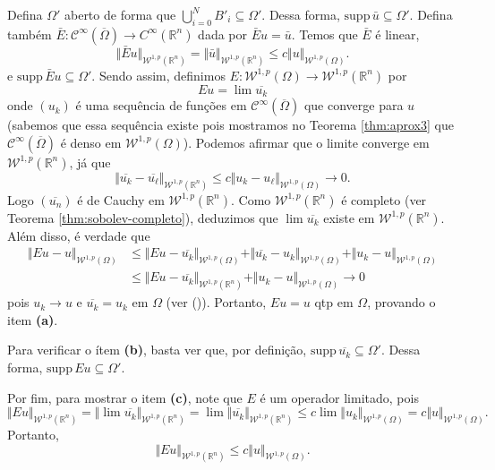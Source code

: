 \documentclass[a4paper, 11pt]{book}
\theoremstyle{definition}
\newcommand{\bR}{\mathbb{R}}
\newcommand{\cC}{\mathcal{C}}
\newcommand{\cW}{\mathcal{W}}
\newcommand{\supp}{\mathrm{supp}\,}
\begin{document}
\begin{prf}
    Defina $\Omega'$ aberto de forma que $\bigcup_{i=0}^N B'_i \subseteq \Omega'$.
    Dessa forma, $\supp \bar u \subseteq \Omega'$.
    Defina também $\bar E: \cC^\infty(\overline\Omega) \to C^\infty(\bR^n)$ dada por $\bar E u = \bar u$.
    Temos que $\bar E$ é linear,
    \[
        \Vert \bar E u \Vert_{\cW^{1,p}(\bR^n)} = \Vert \bar u \Vert_{\cW^{1,p}(\bR^n)} \leqslant c \Vert u \Vert_{\cW^{1,p}(\Omega)}.
    \]
    e $\supp \bar E u \subseteq \Omega'.$
    Sendo assim, definimos $E : \cW^{1,p}(\Omega) \to \cW^{1,p}(\bR^n)$ por
    \[
        Eu = \lim \overline{u_k}
    \]
    onde $(u_k)$ é uma sequência de funções em $\cC^\infty(\overline\Omega)$ que converge para $u$ (sabemos que essa sequência existe pois mostramos no Teorema \ref{thm:aprox3} que $\cC^\infty(\overline\Omega)$ é denso em $\cW^{1,p}(\Omega)$).
    Podemos afirmar que o limite converge em $\cW^{1,p}(\bR^n)$, já que
    \[
        \Vert \overline{u_k} - \overline{u_\ell} \Vert_{\cW^{1,p}(\bR^n)} \leqslant c \Vert u_k - u_\ell \Vert_{\cW^{1,p}(\Omega)} \to 0.
    \]
    Logo $(\overline{u_n})$ é de Cauchy em $\cW^{1,p}(\bR^n)$.
    Como $\cW^{1,p}(\bR^n)$ é completo (ver Teorema \ref{thm:sobolev-completo}), deduzimos que $\lim \overline{u_k}$ existe em $\cW^{1,p}(\bR^n)$.
    Além disso, é verdade que
    \[
        \begin{aligned}
            \Vert Eu - u \Vert_{\cW^{1,p}(\Omega)} &\leqslant \Vert Eu - \overline{u_k} \Vert_{\cW^{1,p}(\Omega)} + \Vert \overline{u_k} - u_k \Vert_{\cW^{1,p}(\Omega)} + \Vert u_k - u\Vert_{\cW^{1,p}(\Omega)}\\
            &\leqslant \Vert Eu - \overline{u_k} \Vert_{\cW^{1,p}(\bR^n)} + \Vert u_k - u \Vert_{\cW^{1,p}(\Omega)} \to 0
        \end{aligned}
    \]
    pois $u_k \to u$ e $\overline{u_k} = u_k$ em $\Omega$ (ver ()).
    Portanto, $Eu = u$ qtp em $\Omega$, provando o item \textbf{(a)}.

    Para verificar o ítem \textbf{(b)}, basta ver que, por definição, $\supp \overline{u_k} \subseteq \Omega'$.
    Dessa forma, $\supp Eu \subseteq \Omega'$.

    Por fim, para mostrar o item \textbf{(c)}, note que $E$ é um operador limitado, pois
    \[
        \Vert Eu \Vert_{\cW^{1,p}(\bR^n)} = \Vert \lim \overline{u_k} \Vert_{\cW^{1,p}(\bR^n)} = \lim \Vert \overline{u_k} \Vert_{\cW^{1,p}(\bR^n)} \leqslant c \lim \Vert u_k \Vert_{\cW^{1,p}(\Omega)} = c \Vert u \Vert_{\cW^{1,p}(\Omega)}.
    \]
    Portanto,
    \[
        \Vert Eu \Vert_{\cW^{1,p}(\bR^n)} \leqslant c \Vert u \Vert_{\cW^{1,p}(\Omega)}.
    \]
\end{prf}
\end{document}
